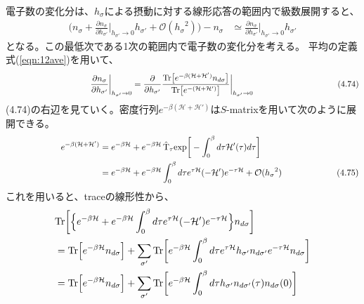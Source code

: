 \documentclass[a4j]{jarticle}
\begin{document}
電子数の変化分は、$h_{\sigma}$による摂動に対する線形応答の範囲内で級数展開すると、
\begin{align}
	\bigg(
	n_{\sigma}
	+
	\frac{\partial n_{\sigma}}{\partial h_{\sigma'}}
	\bigg|_{h_{\sigma'} \to 0}
	h_{\sigma'}
	+
	\mathcal{O}({h_{\sigma}}^{2})
	\bigg)
	-
	n_{\sigma}
	 & \simeq
	\frac{\partial n_{\sigma}}{\partial h_{\sigma'}}
	\bigg|_{h_{\sigma'} \to 0}
	h_{\sigma'}
\end{align}
となる。この最低次である1次の範囲内で電子数の変化分を考える。
平均の定義式(\ref{eqn:12ave})を用いて、
\begin{align}
	\hspace{35.5mm}
	\frac{\partial n_{\sigma}}{\partial h_{\sigma'}}
	\bigg|_{h_{\sigma'} \to 0}
	=
	\frac{\partial}{\partial h_{\sigma'}}
	\frac{
		{\rm Tr} \big[ e^{- \beta (\mathcal{H}+\mathcal{H}') } n_{d \sigma} \big]
	}{
		{\rm Tr} \big[ e^{- (\mathcal{H}+\mathcal{H}') } \big]
	}
	\bigg|_{h_{\sigma'} \to 0}
	\nonumber
	\hspace{35.5mm}
	(4.74)
\end{align}
(4.74)の右辺を見ていく。密度行列$e^{- \beta (\mathcal{H}+\mathcal{H}')}$は$S$-matrixを用いて次のように展開できる。
\begin{align}
	\hspace{22.4mm}
	e^{- \beta (\mathcal{H}+\mathcal{H}') }
	 & =
	e^{- \beta \mathcal{H} }
	+
	e^{- \beta \mathcal{H} }
	\ \!
	\hat{\rm T}_{\tau}
	{\rm exp}
	\bigg[
		-
		\int^{\beta}_{0}d \tau
		\mathcal{H}'(\tau)
		d \tau
		\bigg]
	\nonumber \\
	 & =
	e^{- \beta \mathcal{H} }
	+
	e^{- \beta \mathcal{H} }
	\int^{\beta}_{0}d \tau
	e^{\tau \mathcal{H}}
	( - \mathcal{H}' )
	e^{- \tau \mathcal{H}}
	+
	\mathcal{O}({h_{\sigma}}^{2})
	\nonumber
	\hspace{22.4mm}
	(4.75)
\end{align}
これを用いると、traceの線形性から、
\begin{align}
	 &
	{\rm Tr}
	\bigg[
		\Big\{
		e^{- \beta \mathcal{H} }
		+
		e^{- \beta \mathcal{H} }
		\int^{\beta}_{0}d \tau
		e^{\tau \mathcal{H}}
		( - \mathcal{H}' )
		e^{- \tau \mathcal{H}}
		\Big\}
		n_{d \sigma}
		\bigg]
	\nonumber \\
	 & =
	{\rm Tr}
	\Big[
		e^{- \beta \mathcal{H} }
		n_{d \sigma}
		\Big]
	+
	\sum_{\sigma'}
	{\rm Tr}
	\bigg[
		e^{- \beta \mathcal{H} }
		\int^{\beta}_{0}d \tau
		e^{\tau \mathcal{H}}
		h_{\sigma'}
		n_{d \sigma'}
		e^{- \tau \mathcal{H}}
		n_{d \sigma}
		\bigg]
	\nonumber
	\\
	 & =
	{\rm Tr}
	\Big[
		e^{- \beta \mathcal{H} }
		n_{d \sigma}
		\Big]
	+
	\sum_{\sigma'}
	{\rm Tr}
	\bigg[
		e^{- \beta \mathcal{H} }
		\int^{\beta}_{0}d \tau
		h_{\sigma'}
		n_{d \sigma'}(\tau)
		n_{d \sigma}(0)
		\bigg]
\end{align}
\end{document}
